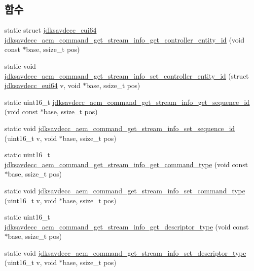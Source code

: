 \subsection*{함수}
\begin{DoxyCompactItemize}
\item 
static struct \hyperlink{structjdksavdecc__eui64}{jdksavdecc\+\_\+eui64} \hyperlink{group__command__get__stream__info_ga540e60201d42805b46b935969f3cb6e7}{jdksavdecc\+\_\+aem\+\_\+command\+\_\+get\+\_\+stream\+\_\+info\+\_\+get\+\_\+controller\+\_\+entity\+\_\+id} (void const $\ast$base, ssize\+\_\+t pos)
\item 
static void \hyperlink{group__command__get__stream__info_gaf6d38f57174e75acbf34fb3461f582a9}{jdksavdecc\+\_\+aem\+\_\+command\+\_\+get\+\_\+stream\+\_\+info\+\_\+set\+\_\+controller\+\_\+entity\+\_\+id} (struct \hyperlink{structjdksavdecc__eui64}{jdksavdecc\+\_\+eui64} v, void $\ast$base, ssize\+\_\+t pos)
\item 
static uint16\+\_\+t \hyperlink{group__command__get__stream__info_gaffdc9eb948501eee790bafc7df976dc3}{jdksavdecc\+\_\+aem\+\_\+command\+\_\+get\+\_\+stream\+\_\+info\+\_\+get\+\_\+sequence\+\_\+id} (void const $\ast$base, ssize\+\_\+t pos)
\item 
static void \hyperlink{group__command__get__stream__info_ga0fa78201d6973bfe50d604a4bc77b779}{jdksavdecc\+\_\+aem\+\_\+command\+\_\+get\+\_\+stream\+\_\+info\+\_\+set\+\_\+sequence\+\_\+id} (uint16\+\_\+t v, void $\ast$base, ssize\+\_\+t pos)
\item 
static uint16\+\_\+t \hyperlink{group__command__get__stream__info_ga00db22b5da7aa4df9f676df693463eba}{jdksavdecc\+\_\+aem\+\_\+command\+\_\+get\+\_\+stream\+\_\+info\+\_\+get\+\_\+command\+\_\+type} (void const $\ast$base, ssize\+\_\+t pos)
\item 
static void \hyperlink{group__command__get__stream__info_ga7d3b5583fa3fe76ffc4348f7edcfac20}{jdksavdecc\+\_\+aem\+\_\+command\+\_\+get\+\_\+stream\+\_\+info\+\_\+set\+\_\+command\+\_\+type} (uint16\+\_\+t v, void $\ast$base, ssize\+\_\+t pos)
\item 
static uint16\+\_\+t \hyperlink{group__command__get__stream__info_gaf92ebddd5248e9703556a64f5a191a8f}{jdksavdecc\+\_\+aem\+\_\+command\+\_\+get\+\_\+stream\+\_\+info\+\_\+get\+\_\+descriptor\+\_\+type} (void const $\ast$base, ssize\+\_\+t pos)
\item 
static void \hyperlink{group__command__get__stream__info_ga30b7a8bb43631792757b2107fd6b353f}{jdksavdecc\+\_\+aem\+\_\+command\+\_\+get\+\_\+stream\+\_\+info\+\_\+set\+\_\+descriptor\+\_\+type} (uint16\+\_\+t v, void $\ast$base, ssize\+\_\+t pos)

\end{DoxyCompactItemize}
